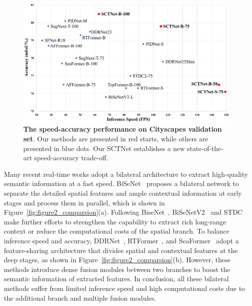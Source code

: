 \documentclass[letterpaper]{article} %
\begin{document}
\begin{figure}[tb]
  \begin{center}
     \includegraphics[width=\linewidth]{./image/figure1_trade-off_small3.pdf}
  \end{center}
     \caption{\textbf{The speed-accuracy performance on Cityscapes validation set}. Our methods are presented in red starts, while others are presented in blue dots. Our SCTNet establishes a new state-of-the-art speed-accuracy trade-off.}
  \label{fig:figure1_trade-off}
  \end{figure}

Many recent real-time works adopt a bilateral architecture to extract high-quality semantic information at a fast speed. BiSeNet~\cite{yu2018bisenet} proposes a bilateral network to separate the detailed spatial features and ample contextual information at early stages and process them in parallel, which is shown in Figure~\ref{fig:figure2_comparsion}(a). Following BiseNet~\cite{yu2018bisenet}, BiSeNetV2~\cite{yu2021bisenet} and STDC~\cite{fan2021rethinking} make further efforts to strengthen the capability to extract rich long-range context or reduce the computational costs of the spatial branch. To balance inference speed and accuracy, DDRNet~\cite{pan2022deep}, RTFormer~\cite{wang2022rtformer}, and SeaFormer~\cite{wan2023seaformer} adopt a feature-sharing architecture that divides spatial and contextual features at the deep stages, as shown in Figure~\ref{fig:figure2_comparsion}(b). However, these methods introduce dense fusion modules between two branches to boost the semantic information of extracted features. In conclusion, all these bilateral methods suffer from limited inference speed and high computational costs due to the additional branch and multiple fusion modules.
\end{document}
